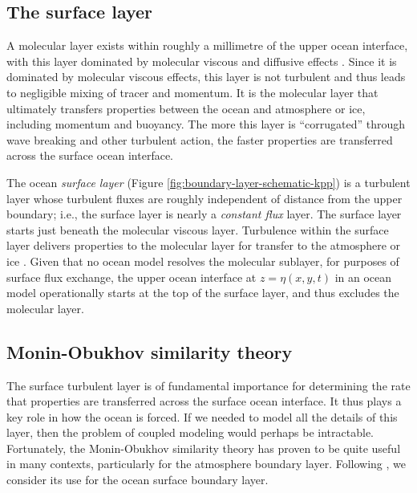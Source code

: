 \subsection{The surface layer}
\label{subsection:surface-layer}


A molecular layer exists within roughly a millimetre of the upper
ocean interface, with this layer dominated by molecular viscous and
diffusive effects \citep{LargeKPP_lectures,Large2012}.  Since it is
dominated by molecular viscous effects, this layer is not turbulent
and thus leads to negligible mixing of tracer and momentum.  It is the
molecular layer that ultimately transfers properties between the ocean
and atmosphere or ice, including momentum and buoyancy.  The more this
layer is ``corrugated'' through wave breaking and other turbulent
action, the faster properties are transferred across the surface ocean
interface.

The ocean {\it surface layer} (Figure
\ref{fig:boundary-layer-schematic-kpp}) is a turbulent layer whose
turbulent fluxes are roughly independent of distance from the upper
boundary; i.e., the surface layer is nearly a {\it constant flux}
layer.  The surface layer starts just beneath the molecular viscous
layer.  Turbulence within the surface layer delivers properties to the
molecular layer for transfer to the atmosphere or ice
\citep{Fairall_etal1996}.  Given that no ocean model resolves the
molecular sublayer, for purposes of surface flux exchange, the upper
ocean interface at $z=\eta(x,y,t)$ in an ocean model operationally
starts at the top of the surface layer, and thus excludes the
molecular layer.


\subsection{Monin-Obukhov similarity theory}
\label{subsection:m-o-similarity-theory}

The surface turbulent layer is of fundamental importance for
determining the rate that properties are transferred across the
surface ocean interface.  It thus plays a key role in how the ocean is
forced.  If we needed to model all the details of this layer, then the
problem of coupled modeling would perhaps be intractable.
Fortunately, the Monin-Obukhov similarity theory has proven to be
quite useful in many contexts, particularly for the atmosphere
boundary layer.  Following \cite{LargeKPP}, we consider its use for
the ocean surface boundary layer.

